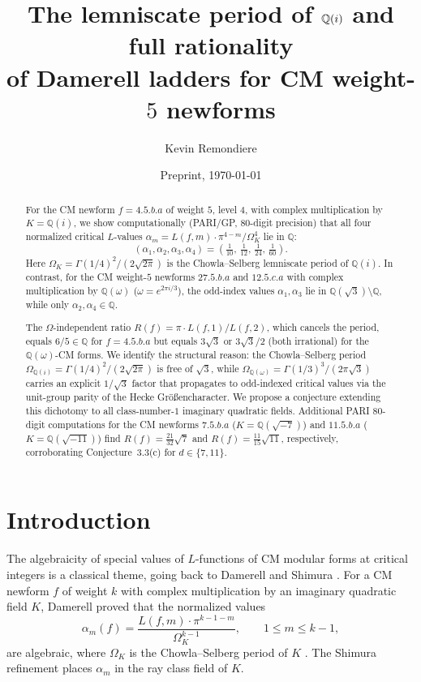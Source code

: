 \documentclass[10pt]{article}
\title{The lemniscate period of $\Q(i)$ and full rationality\\
       of Damerell ladders for CM weight-$5$ newforms}
\author{Kevin Remondiere}
\date{Preprint, \today}
\theoremstyle{definition}
\newcommand{\Q}{\mathbb{Q}}
\begin{document}
\maketitle

\begin{abstract}
For the CM newform $f = 4.5.b.a$ of weight $5$, level $4$, with complex multiplication
by $K = \Q(i)$, we show computationally (PARI/GP, $80$-digit precision) that all four
normalized critical $L$-values $\alpha_m = L(f,m)\cdot\pi^{4-m}/\Omega_K^4$ lie in $\Q$:
\[
  (\alpha_1, \alpha_2, \alpha_3, \alpha_4) = \!\left(\tfrac{1}{10},\, \tfrac{1}{12},\,
  \tfrac{1}{24},\, \tfrac{1}{60}\right).
\]
Here $\Omega_K = \Gamma(1/4)^2/(2\sqrt{2\pi})$ is the Chowla--Selberg lemniscate period
of $\Q(i)$.  In contrast, for the CM weight-$5$ newforms $27.5.b.a$ and $12.5.c.a$
with complex multiplication by $\Q(\omega)$ ($\omega = e^{2\pi i/3}$), the odd-index
values $\alpha_1, \alpha_3$ lie in $\Q(\sqrt{3})\setminus\Q$, while only $\alpha_2,
\alpha_4 \in \Q$.

The $\Omega$-independent ratio $R(f) = \pi\cdot L(f,1)/L(f,2)$, which cancels the period,
equals $6/5 \in \Q$ for $f = 4.5.b.a$ but equals $3\sqrt{3}$ or $3\sqrt{3}/2$ (both
irrational) for the $\Q(\omega)$-CM forms.  We identify the structural reason: the
Chowla--Selberg period $\Omega_{\Q(i)} = \Gamma(1/4)^2/(2\sqrt{2\pi})$ is free of
$\sqrt{3}$, while $\Omega_{\Q(\omega)} = \Gamma(1/3)^3/(2\pi\sqrt{3})$ carries an
explicit $1/\sqrt{3}$ factor that propagates to odd-indexed critical values via the
unit-group parity of the Hecke Gr\"{o}{\ss}encharacter.  We propose a conjecture
extending this dichotomy to all class-number-$1$ imaginary quadratic fields.
Additional PARI $80$-digit computations for the CM newforms $7.5.b.a$ ($K=\Q(\sqrt{-7})$)
and $11.5.b.a$ ($K=\Q(\sqrt{-11})$) find $R(f) = \tfrac{21}{32}\sqrt{7}$ and
$R(f) = \tfrac{11}{15}\sqrt{11}$, respectively, corroborating Conjecture~3.3(c)
for $d\in\{7,11\}$.
\end{abstract}

\section{Introduction}
\label{sec:intro}

The algebraicity of special values of $L$-functions of CM modular forms at critical
integers is a classical theme, going back to Damerell \cite{Dam70, Dam71} and
Shimura \cite{Shi76}.  For a CM newform $f$ of weight $k$ with complex multiplication
by an imaginary quadratic field $K$, Damerell proved that the normalized values
\begin{equation}\label{eq:alpha}
  \alpha_m(f) = \frac{L(f, m) \cdot \pi^{k-1-m}}{\Omega_K^{k-1}},
  \qquad 1 \leq m \leq k-1,
\end{equation}
are algebraic, where $\Omega_K$ is the Chowla--Selberg period of $K$ \cite{CS67}.
The Shimura refinement \cite{Shi76} places $\alpha_m$ in the ray class field of $K$.
\end{document}
